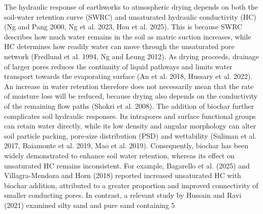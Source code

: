 The hydraulic response of earthworks to atmospheric drying depends on both the soil-water retention curve (SWRC) and unsaturated hydraulic conductivity (HC) (Ng and Pang 2000, Ng et al. 2023, Hou et al. 2025). This is because SWRC describes how much water remains in the soil as matric suction increases, while HC determines how readily water can move through the unsaturated pore network (Fredlund et al. 1994, Ng and Leung 2012). As drying proceeds, drainage of larger pores reduces the continuity of liquid pathways and limits water transport towards the evaporating surface (An et al. 2018, Hussary et al. 2022). An increase in water retention therefore does not necessarily mean that the rate of moisture loss will be reduced, because drying also depends on the conductivity of the remaining flow paths (Shokri et al. 2008). The addition of biochar further complicates soil hydraulic responses. Its intrapores and surface functional groups can retain water directly, while its low density and angular morphology can alter soil particle packing, pore-size distribution (PSD) and wettability (Suliman et al. 2017, Baiamonte et al. 2019, Mao et al. 2019). Consequently, biochar has been widely demonstrated to enhance soil water retention, whereas its effect on unsaturated HC remains inconsistent. For example, Bagarello et al. (2025) and Villagra-Mendoza and Horn (2018) reported increased unsaturated HC with biochar addition, attributed to a greater proportion and improved connectivity of smaller conducting pores. In contrast, a relevant study by Hussain and Ravi (2021) examined silty sand and pure sand containing 5%
